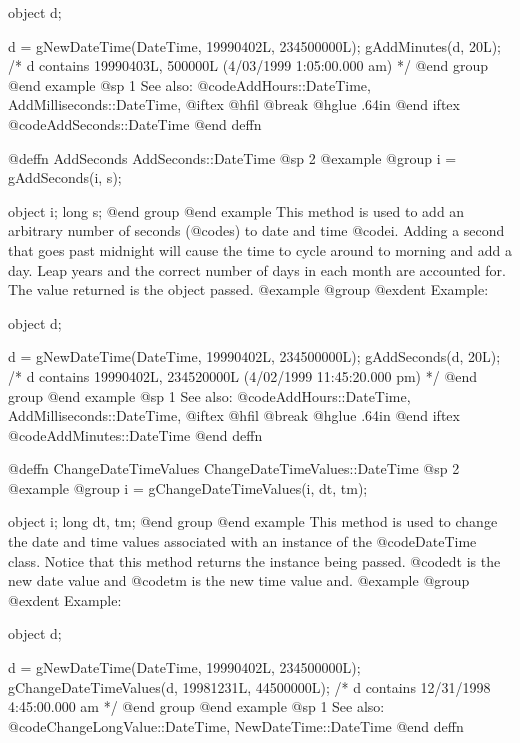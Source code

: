 object  d;

d = gNewDateTime(DateTime, 19990402L, 234500000L);
gAddMinutes(d, 20L);
/*  d contains 19990403L, 500000L
    (4/03/1999 1:05:00.000 am) */
@end group
@end example
@sp 1
See also:  @code{AddHours::DateTime, AddMilliseconds::DateTime,}
@iftex
@hfil @break @hglue .64in      
@end iftex
@code{AddSeconds::DateTime}
@end deffn











@deffn {AddSeconds} AddSeconds::DateTime
@sp 2
@example
@group
i = gAddSeconds(i, s);

object  i;
long    s;
@end group
@end example
This method is used to add an arbitrary number of seconds (@code{s}) to
date and time @code{i}.  Adding a second that goes past midnight will cause
the time to cycle around to morning and add a day.  Leap years and the correct
number of days in each month are accounted for.  The value returned is the
object passed.
@example
@group
@exdent Example:

object  d;

d = gNewDateTime(DateTime, 19990402L, 234500000L);
gAddSeconds(d, 20L);
/*  d contains 19990402L, 234520000L
    (4/02/1999 11:45:20.000 pm) */
@end group
@end example
@sp 1
See also:  @code{AddHours::DateTime, AddMilliseconds::DateTime,}
@iftex
@hfil @break @hglue .64in      
@end iftex
@code{AddMinutes::DateTime}
@end deffn










@deffn {ChangeDateTimeValues} ChangeDateTimeValues::DateTime
@sp 2
@example
@group
i = gChangeDateTimeValues(i, dt, tm);

object  i;
long    dt, tm;
@end group
@end example
This method is used to change the date and time values associated
with an instance of the @code{DateTime} class.  Notice that this method
returns the instance being passed.  @code{dt} is the new date value and
@code{tm} is the new time value and.
@example
@group
@exdent Example:

object  d;

d = gNewDateTime(DateTime, 19990402L, 234500000L);
gChangeDateTimeValues(d, 19981231L, 44500000L);
/*  d contains 12/31/1998 4:45:00.000 am  */
@end group
@end example
@sp 1
See also:  @code{ChangeLongValue::DateTime, NewDateTime::DateTime}
@end deffn










